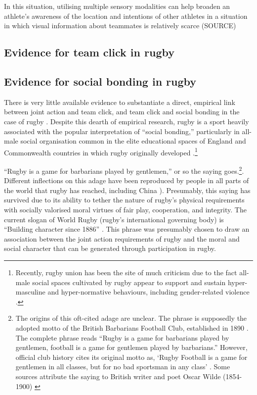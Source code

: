 \begin{CJK}{UTF8}{gbsn}
In this situation, utilising multiple sensory modalities can help broaden an athlete's awareness of the location and intentions of other athletes in a situation in which visual information about teammates is relatively scarce (SOURCE)

\subsection{Evidence for team click in rugby}









\subsection{Evidence for social bonding in rugby}
There is very little available evidence to substantiate a direct, empirical link between joint action and team click, and team click and social bonding in the case of rugby \citep[but for a discussion, see][]{Davis2015}.  Despite this dearth of empirical research, rugby is a sport heavily associated with the popular interpretation of ``social bonding,'' particularly in all-male social organisation common in the elite educational spaces of England and Commonwealth countries in which rugby originally developed \citep{Dunning2005,Richards2007,Collins2008}.\footnote{Recently, rugby union has been the site of much criticism due to the fact all-male social spaces cultivated by rugby appear to support and sustain hyper-masculine and hyper-normative behaviours, including gender-related violence \citep{Cosslett2014}.}

``Rugby is a game for barbarians played by gentlemen,'' or so the saying goes.\footnote{The origins of this oft-cited adage are unclear.  The phrase is supposedly the adopted motto of the British Barbarians Football Club, established in 1890 \citep[34]{Dunning2005}.  The complete phrase reads ``Rugby is a game for barbarians played by gentlemen, football is a game for gentlemen played by barbarians.''  However, official club history cites its original motto as, ‘Rugby Football is a game for gentlemen in all classes, but for no bad sportsman in any class' \citep[vii]{Starmer-Smith1977}.  Some sources attribute the saying to British writer and poet Oscar Wilde (1854-1900) \citep{Fleenor2015}}. Different inflections on this adage have been reproduced by people in all parts of the world that rugby has reached, including China \citep[see][]{Taylor2010}).  Presumably, this saying has survived due to its ability to tether the nature of rugby's physical requirements with socially valorised moral virtues of fair play, cooperation, and integrity.  The current slogan of World Rugby (rugby's international governing body) is ``Building character since 1886'' \citep{WorldRugby2017}.  This phrase was presumably chosen to draw an association between the joint action requirements of rugby and the moral and social character that can be generated through participation in rugby.




\end{CJK}
